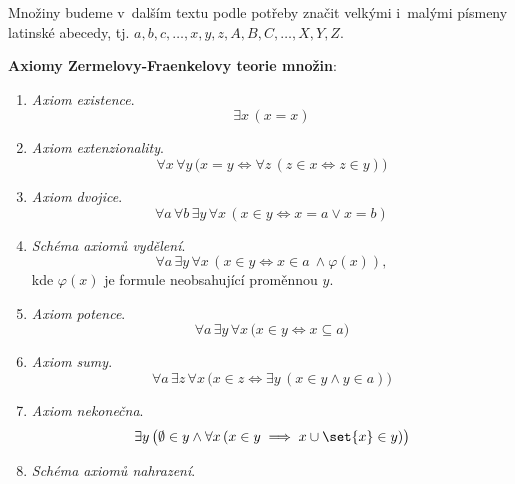 \begin{convention}
    Množiny budeme v~dalším textu podle potřeby značit velkými i~malými písmeny latinské abecedy, tj. $a,b,c,\dots,x,y,z,A,B,C,\dots,X,Y,Z$.
\end{convention}
\noindent\textbf{Axiomy Zermelovy-Fraenkelovy teorie množin}:
\begin{enumerate}[label=({ZF}\arabic*)]
    \item\label{item:axiom_existence} \emph{Axiom existence}.
    \begin{equation*}
        \exists x\,(x=x)
    \end{equation*}
    \item\label{item:axiom_extenzionality} \emph{Axiom extenzionality}.
    \begin{equation*}
        \forall x\,\forall y\,\bigl(x=y \iff \forall z\,(z\in x \iff z\in y)\bigr)
    \end{equation*}
    \item\label{item:axiom_dvojice} \emph{Axiom dvojice}.
    \begin{equation*}
        \forall a\,\forall b\,\exists y\,\forall x\,(x \in y \iff x=a \lor x=b)
    \end{equation*}
    \item\label{item:schema_axiomu_vydeleni} \emph{Schéma axiomů vydělení}.
    \begin{equation*}
        \forall a\,\exists y\,\forall x\,(x\in y \iff x\in a~\land \varphi(x)),
    \end{equation*}
    kde $\varphi(x)$ je formule neobsahující proměnnou $y$.
    \item\label{item:axiom_potence} \emph{Axiom potence}.
    \begin{equation*}
        \forall a\,\exists y\,\forall x\,\bigl(x\in y \iff x\subseteq a\bigr)
    \end{equation*}
    \item\label{item:axiom_sumy} \emph{Axiom sumy}.
    \begin{equation*}
        \forall a\,\exists z\,\forall x\,\bigl(x\in z\iff \exists y\,(x\in y \land y\in a)\bigr)
    \end{equation*}
    \item\label{item:axiom_nekonecna} \emph{Axiom nekonečna}.
    \begin{equation*}
        \exists y\,\bigl(\emptyset\in y \land \forall x\,(x\in y\implies x\cup\set{x}\in y)\bigr)
    \end{equation*}
    \item\label{item:schema_axiomu_nahrazeni} \emph{Schéma axiomů nahrazení}.

\end{enumerate}
